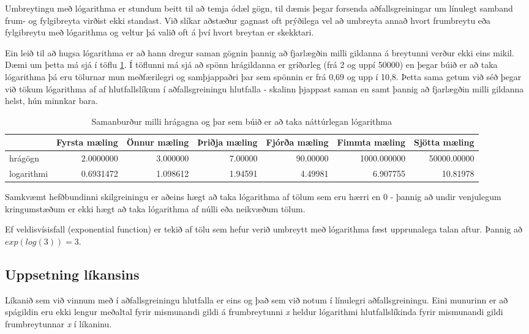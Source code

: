 \documentclass[]{book}
\begin{document}
Umbreytingu með lógarithma er stundum beitt til að temja ódæl gögn, til dæmis þegar forsenda aðfallsgreiningar um línulegt samband frum- og fylgibreyta virðist ekki standast. Við slíkar aðstæður gagnast oft prýðilega vel að umbreyta annað hvort frumbreytu eða fylgibreytu með lógarithma og veltur þá valið oft á því hvort breytan er skekktari.

Ein leið til að hugsa lógarithma er að hann dregur saman gögnin þannig að fjarlægðin milli gildanna á breytunni verður ekki eins mikil. Dæmi um þetta má sjá í töflu \ref{tab:logtafla}. Í töflunni má sjá að spönn hrágildanna er gríðarleg (frá 2 og uppí 50000) en þegar búið er að taka lógarithma þá eru tölurnar mun meðfærilegri og samþjappaðri þar sem spönnin er frá 0,69 og upp í 10,8. Þetta sama getum við séð þegar við tökum lógarithma af af hlutfallslíkum í aðfallsgreiningu hlutfalla - skalinn þjappast saman en samt þannig að fjarlægðin milli gildanna helst, hún minnkar bara.

\begin{table}

\caption{\label{tab:logtafla}Samanburður milli hrágagna og þar sem búið er að taka náttúrlegan lógarithma}
\centering
\begin{tabular}[t]{lrrrrrr}
\toprule
  & Fyrsta mæling & Önnur mæling & Þriðja mæling & Fjórða mæling & Fimmta mæling & Sjötta mæling\\
\midrule
hrágögn & 2.0000000 & 3.000000 & 7.00000 & 90.00000 & 1000.000000 & 50000.00000\\
logarithmi & 0.6931472 & 1.098612 & 1.94591 & 4.49981 & 6.907755 & 10.81978\\
\bottomrule
\end{tabular}
\end{table}

Samkvæmt hefðbundinni skilgreiningu er aðeins hægt að taka lógarithma af tölum sem eru hærri en 0 - þannig að undir venjulegum kringumstæðum er ekki hægt að taka lógarithma af núlli eða neikvæðum tölum.

Ef veldisvísisfall (exponential function) er tekið af tölu sem hefur verið umbreytt með lógarithma fæst upprunalega talan aftur. Þannig að \(exp(log(3))=3\).

\hypertarget{uppsetning-luxedkansins}{%
\subsection{Uppsetning líkansins}\label{uppsetning-luxedkansins}}

Líkanið sem við vinnum með í aðfallsgreiningu hlutfalla er eins og það sem við notum í línulegri aðfallsgreiningu. Eini munurinn er að spágildin eru ekki lengur meðaltal fyrir mismunandi gildi á frumbreytunni \emph{x} heldur lógarithmi hlutfallslíkinda fyrir mismunandi gildi frumbreytunnar \emph{x} í líkaninu.
\end{document}
